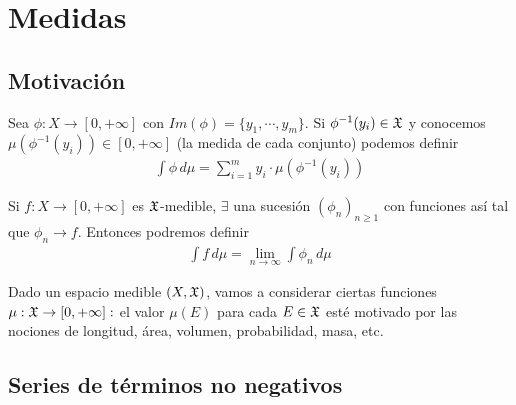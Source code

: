 \section{Medidas}

\subsection{Motivación}
Sea $\phi: X \to [0, +\infty]$ con $Im(\phi) = \{ y_1, \cdots, y_m \}$. Si $\phi^{-1}(y_i) \in \mathfrak{X}$ y conocemos
$\mu(\phi^{-1}(y_i)) \in [0, +\infty]$ (la medida de cada conjunto) podemos definir \begin{align*}
    \int \phi \,d\mu = \sum_{i=1}^m y_i \cdot \mu(\phi^{-1}(y_i))
\end{align*}

Si $f: X \to [0, +\infty]$ es $\mathfrak{X}$-medible, $\exists$ una sucesión $(\phi_n)_{n \geq 1}$ con funciones así tal que $\phi_n \to f$. Entonces podremos definir
\begin{align*}
    \int f \,d\mu = \lim_{n \to \infty} \int \phi_n \,d\mu
\end{align*}

Dado un espacio medible $(X, \mathfrak{X})$, vamos a considerar ciertas funciones $\mu : \mathfrak{X} \to [0, +\infty] : $ el valor $\mu(E)$ para cada $E \in \mathfrak{X}$
esté motivado por las nociones de longitud, área, volumen, probabilidad, masa, etc.

\clearpage

\subsection{Series de términos no negativos}


